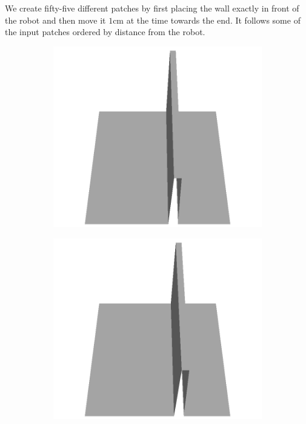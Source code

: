 \documentclass[../document.tex]{subfiles}
\begin{document}
We create fifty-five different patches by first placing the wall exactly in front of the robot and then move it $1$cm at the time towards the end. It follows some of the input patches ordered by distance from the robot.
\begin{figure}[H]
    \centering
    \begin{subfigure}[b]{0.160\textwidth}
    \includegraphics[width=\linewidth]{../img/5/custom_patches/walls_front/all/55-3d.png}
    \end{subfigure}
    \begin{subfigure}[b]{0.160\textwidth}
    \includegraphics[width=\linewidth]{../img/5/custom_patches/walls_front/all/50-3d.png}

\end{subfigure}
\end{figure}
\end{document}
